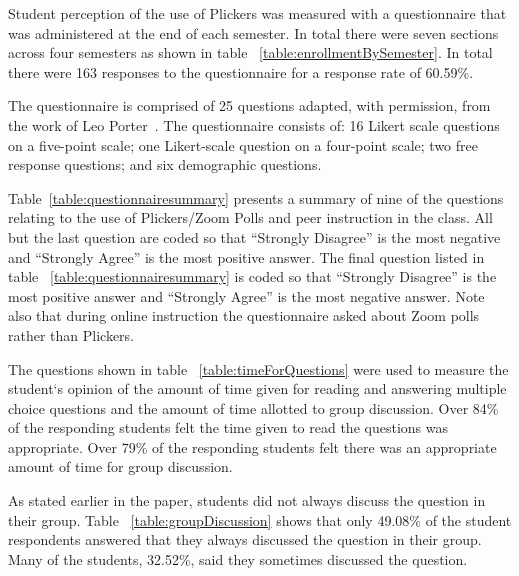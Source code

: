 \documentclass[12pt]{article}
\newcommand\sampleSize{163}
\begin{document}
Student perception of the use of Plickers was measured with a questionnaire that was administered at the end of each semester. In total there were seven sections across four semesters as shown in table ~\ref{table:enrollmentBySemester}. In total there were \sampleSize{}  responses to the questionnaire for a response rate of 60.59\%.

The questionnaire is comprised of 25 questions adapted, with permission, from the work of Leo Porter~\cite{porterPeerInstructionStudents2011}. The questionnaire consists of: 16 Likert scale questions on a five-point scale; one Likert-scale question on a four-point scale;  two free response questions; and six demographic questions. 

Table~\ref{table:questionnairesummary} presents a summary of nine of the questions relating to the use of Plickers/Zoom Polls and peer instruction in the class. All but the last question are coded so that ``Strongly Disagree'' is the most negative and ``Strongly Agree'' is the most positive answer. The final question listed in table ~\ref{table:questionnairesummary} is coded so that ``Strongly Disagree'' is the most positive answer and ``Strongly Agree'' is the most negative answer. Note also that during online instruction the questionnaire asked about Zoom polls rather than Plickers.

The questions shown in table ~\ref{table:timeForQuestions} were used to measure the student`s opinion of the amount of time given for reading and answering multiple choice questions and the amount of time allotted to group discussion. Over 84\% of the responding students felt the time given to read the questions was appropriate. Over 79\% of the responding students felt there was an appropriate amount of time for group discussion. 

As stated earlier in the paper, students did not always discuss the question in their group. Table ~\ref{table:groupDiscussion} shows that only 49.08\% of the student respondents answered that they always discussed the question in their group. Many of the students, 32.52\%, said they sometimes discussed the question. 
\end{document}
